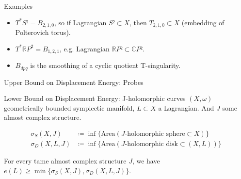 \documentclass[aspectratio=169]{beamer}
\begin{document}
\begin{frame}{Examples}
  \begin{itemize}
    \item<1-> $T^* S² = B_{2,1,0}$, so if Lagrangian $S² ⊂ X$, then $T_{2,1,0} ⊂ X$ (embedding of Polterovich torus).
    \item<2-> $T^* ℝP^2 = B_{1,2,1}$, e.g. Lagrangian $ℝP² ⊂ ℂP²$.
    \item<3-> $B_{dpq}$ is the smoothing of a cyclic quotient T-singularity.
  \end{itemize}
\end{frame}

\begin{frame}{Upper Bound on Displacement Energy: Probes}
  \begin{center}

  \end{center}
\end{frame}

\begin{frame}{Lower Bound on Displacement Energy: J-holomorphic curves}
  $(X,ω)$ geometrically bounded symplectic manifold, $L ⊂ X$ a Lagrangian. And $J$ some almost complex structure.
  \begin{definition}
    \begin{align*}
      σ_S(X,J) &≔ \inf\{\text{Area}(J\text{-holomorphic sphere} ⊂ X)\}\\
      σ_D(X,L,J) &≔ \inf\{\text{Area}(J\text{-holomorphic disk} ⊂ (X,L))\}
    \end{align*}
  \end{definition}

  \pause
  \begin{theorem}[Chekanov]
    For every tame almost complex structure $J$, we have $e(L) ≥ \min\{σ_S(X,J), σ_D(X,L,J)\}$.
  \end{theorem}
\end{frame}
\end{document}
